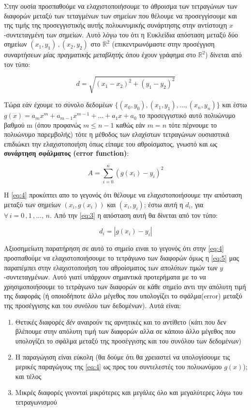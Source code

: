\documentclass[12pt]{article}
\providecommand{\tightlist}{%
      \setlength{\itemsep}{0pt}\setlength{\parskip}{0pt}}
\begin{document}
Στην ουσία προσπαθούμε να ελαχιστοποιήσουμε το άθροισμα των τετραγώνων
των διαφορών μεταξύ των τεταγμένων των σημείων που θέλουμε να
προσεγγίσουμε και της τιμής της προσεγγιστικής αυτής πολυωνυμικής
συνάρτησης στην αντίστοιχη \(x\)-συντεταγμένη των σημείων. Αυτό λόγω του
ότι η Ευκλείδια απόσταση μεταξύ δύο σημείων \((x_1,y_1) \, , (x_2,y_2)\)
στο \(\mathbb{R}^2\) (επικεντρωνόμαστε στην προσέγγιση συναρτήσεων
\emph{μίας πραγματικής μεταβλητής} όπου έχουν γράφημα στο
\(\mathbb{R}^2\)) δίνεται από τον τύπο:

\[
d=\sqrt{(x_1-x_2)^2+(y_1-y_2)^2} \tag{3} \label{eq:3}
\]

Τώρα εάν έχουμε το σύνολο δεδομέων
\(\{(x_0,y_0),(x_1,y_1),\dots,(x_{n},y_{n})\}\) και έστω
\(g(x) = a_mx^m+a_{m-1}x^{m-1}+\dots+a_1x+a_0\) το προσεγγιστικό αυτό
πολυώνυμο βαθμού m (όπου προφανώς \(m\leq n-1\) καθώς εάν \(m=n\) τότε
πέρνουμε το πολυώνυμο παρεμβολής) τότε η μέθοδος των ελαχίστων
τετραγώνων ουσιαστικά επιδιώκει την ελαχιστοποιήση όπως είπαμε του
αθροίσματος, γνωστό και ως \textbf{συνάρτηση σφάλματος (error
function)}:

\[
A=\sum_{i=0}^{n} (g(x_i)-y_i)^2 \tag{4} \label{eq:4} 
\]

H \eqref{eq:4} προκύπτει απο το γεγονός ότι θέλουμε να ελαχιστοποιήσουμε
την απόσταση μεταξύ των σημείων \((x_i,g(x_i))\) και \((x_i,y_i)\); έστω
αυτή η \(d_i\), για \(\forall \, i=0 \,, 1 \,, \dots, \, n\). Aπό την
\eqref{eq:3} η απόσταση αυτή θα δίνεται από τον τύπο:

\[
d_i=|g(x_i)-y_i| \tag{5} \label{eq:5}
\]

Αξιοσημείωτη παρατήρηση σε αυτό το σημείο ειναι το γεγονός ότι στην
\eqref{eq:4} προσπαθούμε να ελαχιστοποιήσουμε το τετράγωνο των διαφορών
όμως η \eqref{eq:5} μας παραπέμπει στην ελαχιστοποιήση του αθροίσματος
των \emph{απολύτων τιμών} των \(y\)-συντεταγμένων. Αυτό γιατί υπάρχουν
σημαντικά προτερήματα με το να χρησιμοποιήσουμε το τετράγωνο των
διαφορών σε κάθε σημείο αντι την απόλυτη τιμή της διαφοράς (ή
οποιοδήποτε άλλο μέγεθος που υπολογίζει το σφάλμα(error) μεταξύ της
προσέγγισης και του συνόλου των δεδομένων). Αυτά είναι:

\begin{enumerate}
\def\labelenumi{\arabic{enumi}.}
\tightlist
\item
  Θετικές διαφορές \emph{δέν} αναιρούν τις αρνητικές και το αντίθετο
  (κάτι που δεν βλέπουμε στην απόλυτη τιμή των διαφορών αλλα σε κάποιο
  άλλο μέγεθος που υπολογίζει το σφάλμα μεταξύ της προσέγγισης και του
  συνόλου των δεδομένων)
\item
  Η παραγώγιση είναι εύκολη (θα δούμε ότι θα χρειαστεί να υπολογίσουμε
  τις μερικές παραγώγους της \eqref{eq:4} ως προς του συντελεστές του
  πολυωνύμου \(g(x)\)); και τέλος
\item
  Μικρές διαφορές γινονταί μικρότερες και μεγάλες όλο και μεγαλύτερες
  λόγω του τετραγωνισμού
\end{enumerate}
\end{document}
